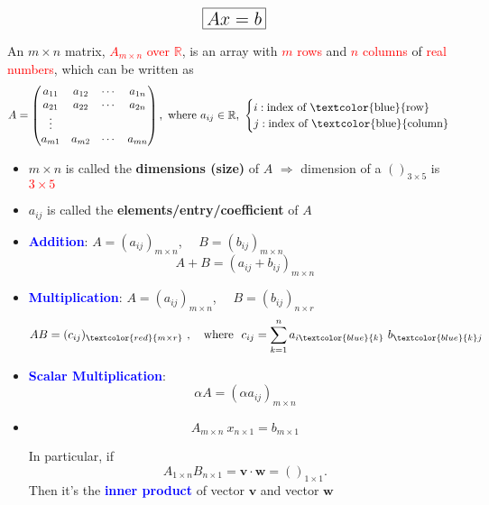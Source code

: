 \[
\Large \boxed{Ax=b}
\]

\begin{definition}
    An $m\times n$ matrix, \textcolor{red}{$A_{m\times n}$ over $\mathbb{R}$}, is an array with \textcolor{red}{$m$ rows} and \textcolor{red}{$n$ columns} of \textcolor{red}{real numbers}, which can be written as 
\[
A=\left(\begin{matrix}
a_{11} & a_{12} & \cdots & a_{1n} \\
a_{21} & a_{22} & \cdots & a_{2n} \\
\vdots  \\
a_{m1} & a_{m2} & \cdots & a_{mn} \\
\end{matrix}\right), \ \text{where } a_{ij} \in \mathbb{R} , \ \begin{cases}
    i: \text{index of \textcolor{blue}{row}}\\
    j: \text{index of \textcolor{blue}{column}}
\end{cases}
\]
\end{definition}

\begin{itemize}
    \item $\boxed{m\times n}$ is called the \textbf{dimensions (size)} of $A$ $\Longrightarrow$ dimension of a $()_{3\times 5}$ is \textcolor{red}{$3\times 5$}
    
    \item $\boxed{a_{ij}}$ is called the \textbf{elements/entry/coefficient} of $A$
    
    \item \textbf{\textcolor{blue}{Addition}}: $A = (a_{ij})_{m\times n}$, $\quad B = (b_{ij})_{m\times n}$
    \[
    A+B = (a_{ij} + b_{ij})_{m\times n}
    \]

    \item \textbf{\textcolor{blue}{Multiplication}}: $A = (a_{ij})_{m\times n}$, $\quad B = (b_{ij})_{n\times r}$
    \[
    AB = (c_{ij})_{\textcolor{red}{m\times r}}\ , \quad \text{where }\ c_{ij} = \sum_{k=1}^{n} a_{i\textcolor{blue}{k}}\ b_{\textcolor{blue}{k}j}
    \]

    \item \textbf{\textcolor{blue}{Scalar Multiplication}}:
    \[
    \alpha A = (\alpha a_{ij})_{m \times n}
    \]
    
    \item
    \[
    A_{m\times n} \ x_{n\times1} = b_{m\times 1}
    \]
        
        In particular, if $$A_{1\times n}B_{n\times1} = \mathbf{v}\cdot \mathbf{w} = ()_{1\times1}.$$ 
        Then it's the \textcolor{blue}{\textbf{inner product}} of vector $\mathbf{v}$ and vector $\mathbf{w}$
    
    \end{itemize}
        
